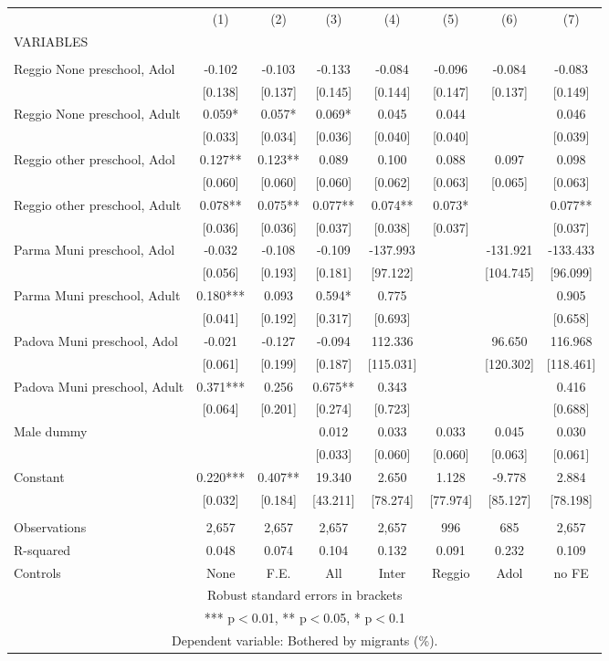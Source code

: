 \begin{tabular}{lccccccc} \hline
 & (1) & (2) & (3) & (4) & (5) & (6) & (7) \\
VARIABLES &  &  &  &  &  &  &  \\ \hline
 &  &  &  &  &  &  &  \\
Reggio None preschool, Adol & -0.102 & -0.103 & -0.133 & -0.084 & -0.096 & -0.084 & -0.083 \\
 & [0.138] & [0.137] & [0.145] & [0.144] & [0.147] & [0.137] & [0.149] \\
Reggio None preschool, Adult & 0.059* & 0.057* & 0.069* & 0.045 & 0.044 &  & 0.046 \\
 & [0.033] & [0.034] & [0.036] & [0.040] & [0.040] &  & [0.039] \\
Reggio other preschool, Adol & 0.127** & 0.123** & 0.089 & 0.100 & 0.088 & 0.097 & 0.098 \\
 & [0.060] & [0.060] & [0.060] & [0.062] & [0.063] & [0.065] & [0.063] \\
Reggio other preschool, Adult & 0.078** & 0.075** & 0.077** & 0.074** & 0.073* &  & 0.077** \\
 & [0.036] & [0.036] & [0.037] & [0.038] & [0.037] &  & [0.037] \\
Parma Muni preschool, Adol & -0.032 & -0.108 & -0.109 & -137.993 &  & -131.921 & -133.433 \\
 & [0.056] & [0.193] & [0.181] & [97.122] &  & [104.745] & [96.099] \\
Parma Muni preschool, Adult & 0.180*** & 0.093 & 0.594* & 0.775 &  &  & 0.905 \\
 & [0.041] & [0.192] & [0.317] & [0.693] &  &  & [0.658] \\
Padova Muni preschool, Adol & -0.021 & -0.127 & -0.094 & 112.336 &  & 96.650 & 116.968 \\
 & [0.061] & [0.199] & [0.187] & [115.031] &  & [120.302] & [118.461] \\
Padova Muni preschool, Adult & 0.371*** & 0.256 & 0.675** & 0.343 &  &  & 0.416 \\
 & [0.064] & [0.201] & [0.274] & [0.723] &  &  & [0.688] \\
Male dummy &  &  & 0.012 & 0.033 & 0.033 & 0.045 & 0.030 \\
 &  &  & [0.033] & [0.060] & [0.060] & [0.063] & [0.061] \\
Constant & 0.220*** & 0.407** & 19.340 & 2.650 & 1.128 & -9.778 & 2.884 \\
 & [0.032] & [0.184] & [43.211] & [78.274] & [77.974] & [85.127] & [78.198] \\
 &  &  &  &  &  &  &  \\
Observations & 2,657 & 2,657 & 2,657 & 2,657 & 996 & 685 & 2,657 \\
R-squared & 0.048 & 0.074 & 0.104 & 0.132 & 0.091 & 0.232 & 0.109 \\
 Controls & None & F.E. & All & Inter & Reggio & Adol & no FE \\ \hline
\multicolumn{8}{c}{ Robust standard errors in brackets} \\
\multicolumn{8}{c}{ *** p$<$0.01, ** p$<$0.05, * p$<$0.1} \\
\multicolumn{8}{c}{ Dependent variable: Bothered by migrants (\%).} \\
\end{tabular}
